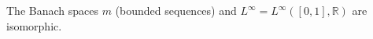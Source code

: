 The Banach spaces $m$ (bounded sequences) and $L^\infty = L^\infty([0,1], \mathbb{R})$ are isomorphic.